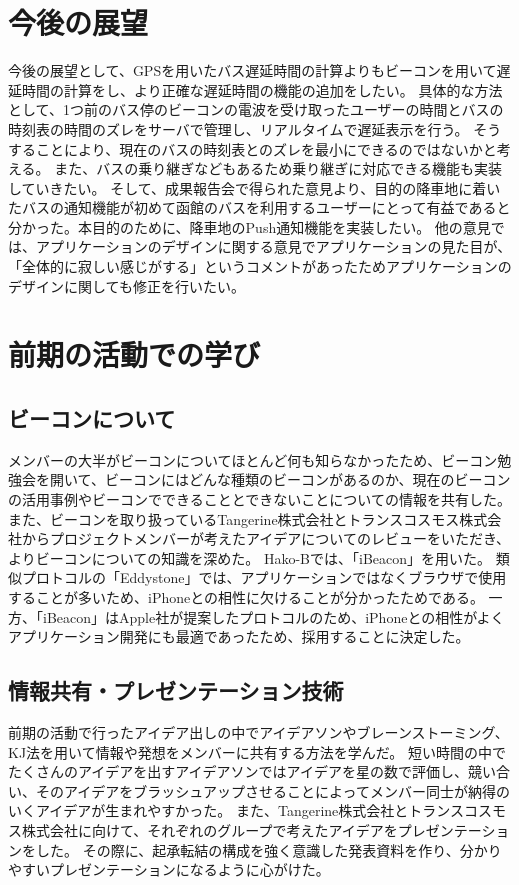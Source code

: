 \documentclass[openany,11pt,papersize]{jsbook}
\begin{document}

\section{今後の展望}
今後の展望として、GPSを用いたバス遅延時間の計算よりもビーコンを用いて遅延時間の計算をし、より正確な遅延時間の機能の追加をしたい。
具体的な方法として、1つ前のバス停のビーコンの電波を受け取ったユーザーの時間とバスの時刻表の時間のズレをサーバで管理し、リアルタイムで遅延表示を行う。
そうすることにより、現在のバスの時刻表とのズレを最小にできるのではないかと考える。
また、バスの乗り継ぎなどもあるため乗り継ぎに対応できる機能も実装していきたい。
そして、成果報告会で得られた意見より、目的の降車地に着いたバスの通知機能が初めて函館のバスを利用するユーザーにとって有益であると分かった。本目的のために、降車地のPush通知機能を実装したい。
他の意見では、アプリケーションのデザインに関する意見でアプリケーションの見た目が、「全体的に寂しい感じがする」というコメントがあったためアプリケーションのデザインに関しても修正を行いたい。



\section{前期の活動での学び}
\subsection{ビーコンについて}
メンバーの大半がビーコンについてほとんど何も知らなかったため、ビーコン勉強会を開いて、ビーコンにはどんな種類のビーコンがあるのか、現在のビーコンの活用事例やビーコンでできることとできないことについての情報を共有した。
また、ビーコンを取り扱っているTangerine株式会社とトランスコスモス株式会社からプロジェクトメンバーが考えたアイデアについてのレビューをいただき、よりビーコンについての知識を深めた。
Hako-Bでは、「iBeacon」を用いた。
類似プロトコルの「Eddystone」では、アプリケーションではなくブラウザで使用することが多いため、iPhoneとの相性に欠けることが分かったためである。
一方、「iBeacon」はApple社が提案したプロトコルのため、iPhoneとの相性がよくアプリケーション開発にも最適であったため、採用することに決定した。


\subsection{情報共有・プレゼンテーション技術}
前期の活動で行ったアイデア出しの中でアイデアソンやブレーンストーミング、KJ法を用いて情報や発想をメンバーに共有する方法を学んだ。
短い時間の中でたくさんのアイデアを出すアイデアソンではアイデアを星の数で評価し、競い合い、そのアイデアをブラッシュアップさせることによってメンバー同士が納得のいくアイデアが生まれやすかった。
また、Tangerine株式会社とトランスコスモス株式会社に向けて、それぞれのグループで考えたアイデアをプレゼンテーションをした。
その際に、起承転結の構成を強く意識した発表資料を作り、分かりやすいプレゼンテーションになるように心がけた。
\end{document}
